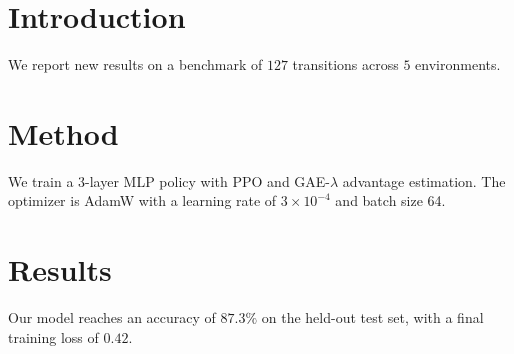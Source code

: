 \documentclass{article}
\begin{document}
\section{Introduction}
We report new results on a benchmark of $127$ transitions across $5$ environments.

\section{Method}
We train a 3-layer MLP policy with PPO and GAE-$\lambda$ advantage estimation.
The optimizer is AdamW with a learning rate of $3 \times 10^{-4}$ and batch size 64.

\section{Results}
Our model reaches an accuracy of $87.3\%$ on the held-out test set,
with a final training loss of $0.42$.
\end{document}
